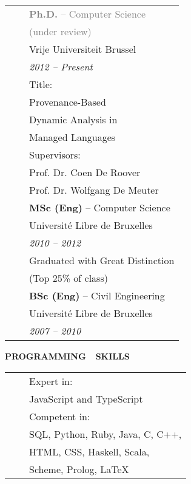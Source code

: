 \documentclass[a4paper,11pt,english]{article}
\newcommand{\LeftColumn}[0]{6.0cm}
\newcommand{\ItemSkip}[0]{4pt}
\newcommand{\SubItemSkip}[0]{0pt}
\newcommand{\SubSubItemSkip}[0]{0pt}
\newcommand{\Bullet}[0]{\faCaretRight~~}
\newcommand{\Rubric}[1]{\colorbox{gray!20}{\parbox{\linewidth}{\centering\sffamily\bfseries{}#1}}}
\begin{document}
\begin{minipage}[t]{\LeftColumn}
\begin{tabular}{@{}l@{}l@{}}
\textcolor{gray}{\Bullet} & \textcolor{gray}{\textbf{Ph.D.} -- Computer Science} \\[\SubSubItemSkip]
& \quad \textcolor{gray}{(under review)} \\[\SubItemSkip]
& Vrije Universiteit Brussel \\[\SubItemSkip]
& \emph{2012 -- Present} \\[\SubItemSkip]
& Title:\\[\SubSubItemSkip]
& \quad Provenance-Based \\[\SubSubItemSkip]
& \quad Dynamic Analysis in \\[\SubSubItemSkip]
& \quad Managed Languages \\[\SubItemSkip]
& Supervisors: \\[\SubSubItemSkip]
& \quad Prof. Dr. Coen De Roover\\[\SubSubItemSkip]
& \quad Prof. Dr. Wolfgang De Meuter\\[\ItemSkip]
\Bullet & \textbf{MSc (Eng)} -- Computer Science \\[\SubItemSkip]
& Université Libre de Bruxelles \\[\SubItemSkip]
& \emph{2010 -- 2012} \\[\SubItemSkip]
& Graduated with Great Distinction \\[\SubSubItemSkip]
& \quad (Top 25\% of class) \\[\ItemSkip]
\Bullet & \textbf{BSc (Eng)} -- Civil Engineering \\[\SubItemSkip]
& Université Libre de Bruxelles \\[\SubItemSkip]
& \emph{2007 -- 2010} \\[0pt]
\end{tabular}

\vspace{12pt}\Rubric{\faCode \quad PROGRAMMING~~SKILLS}\vspace{8pt}

\begin{tabularx}{\linewidth}{@{}l@{}l@{}}
\Bullet & Expert in: \\[0pt]
& \quad JavaScript and TypeScript \\[\ItemSkip]
\Bullet & Competent in: \\[0pt]
& \quad SQL, Python, Ruby, Java, C, C++, \\[0pt]
& \quad HTML, CSS, Haskell, Scala, \\[0pt]
& \quad Scheme, Prolog, LaTeX \\[0pt]
\end{tabularx}

\end{minipage}
\end{document}
